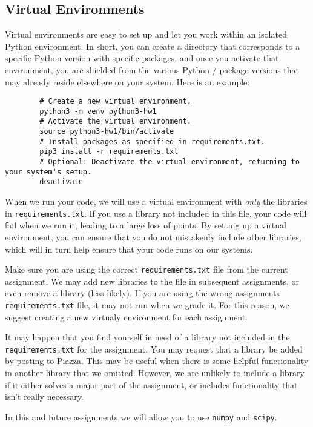 \documentclass[11pt]{article}
\begin{document}
	\subsection{Virtual Environments}
	Virtual environments are easy to set up and let you work within an isolated Python environment. In short, you can create a directory that corresponds to a specific Python version with specific packages, and once you activate that environment, you are shielded from the various Python / package versions that may already reside elsewhere on your system. Here is an example:
	\begin{footnotesize}
		\begin{verbatim}
		# Create a new virtual environment.
		python3 -m venv python3-hw1
		# Activate the virtual environment.
		source python3-hw1/bin/activate
		# Install packages as specified in requirements.txt.
		pip3 install -r requirements.txt
		# Optional: Deactivate the virtual environment, returning to your system's setup.
		deactivate
		\end{verbatim}
	\end{footnotesize}
	
	When we run your code, we will use a virtual environment with \emph{only} the libraries in \texttt{requirements.txt}. If you use a library not included in this file, your code will fail when we run it, leading to a large loss of points. By setting up a virtual environment, you can ensure that you do not mistakenly include other libraries, which will in turn help ensure that your code runs on our systems.
	
	Make sure you are using the correct {\tt requirements.txt} file from the current assignment. We may add new libraries to the file in subsequent assignments, or even remove a library (less likely). If you are using the wrong assignments {\tt requirements.txt} file, it may not run when we grade it. For this reason, we suggest creating a new virtualy environment for each assignment.
	
	It may happen that you find yourself in need of a library not included in the {\tt requirements.txt} for the assignment. You may request that a library be added by posting to Piazza. This may be useful when there is some helpful functionality in another library that we omitted. However, we are unlikely to include a library if it either solves a major part of the assignment, or includes functionality that isn't really necessary.
	
	In this and future assignments we will allow you to use {\tt numpy} and {\tt scipy}.
	
\end{document}
